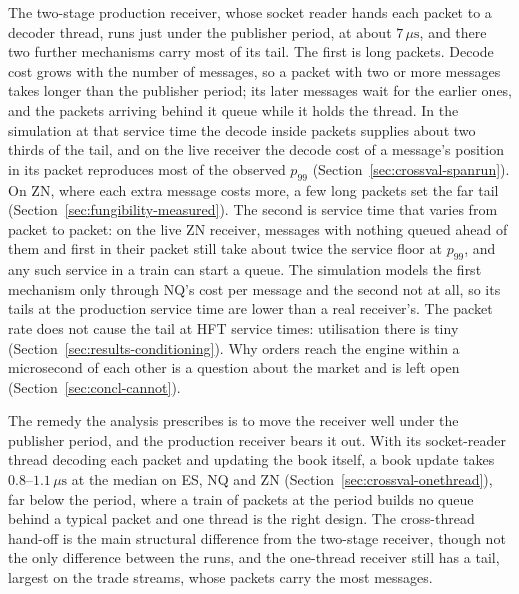 \documentclass[11pt]{article}
\begin{document}
The two-stage production receiver, whose socket reader hands each packet to a decoder
thread, runs just under the publisher period, at about $7\,\mu\mathrm{s}$, and there two
further mechanisms carry most of its tail. The first is long packets. Decode
cost grows with the number of messages, so a packet with two or more messages takes longer
than the publisher period; its later messages wait for the earlier ones, and the packets
arriving behind it queue while it holds the thread. In the simulation at that service time the decode inside packets supplies about two
thirds of the tail, and on the live receiver the decode cost of a message's position in
its packet reproduces most of the observed $p_{99}$ (Section~\ref{sec:crossval-spanrun}).
On ZN, where each extra message costs more, a few long packets set the far tail
(Section~\ref{sec:fungibility-measured}). The second is
service time that varies from packet to packet: on the live ZN receiver, messages with
nothing queued ahead of them and first in their packet still take about twice the service
floor at $p_{99}$, and any such service in a train can start a queue. The simulation
models the first mechanism only through NQ's cost per message and the second not at all,
so its tails at the production service time are lower than a real receiver's. The packet
rate does not cause the tail at HFT service times: utilisation there is tiny
(Section~\ref{sec:results-conditioning}). Why orders reach the engine within a microsecond
of each other is a question about the market and is left open
(Section~\ref{sec:concl-cannot}).

The remedy the analysis prescribes is to move the receiver well under the publisher
period, and the production receiver bears it out. With its socket-reader thread decoding
each packet and updating the book itself, a book update takes $0.8$--$1.1\,\mu\mathrm{s}$
at the median on ES, NQ and ZN (Section~\ref{sec:crossval-onethread}), far below the
period, where a train of packets at the period builds no queue behind a typical packet and
one thread is the right design. The cross-thread hand-off is the main structural
difference from the two-stage receiver, though not the only difference between the runs,
and the one-thread receiver still has a tail, largest on the trade streams, whose packets
carry the most messages.
\end{document}
